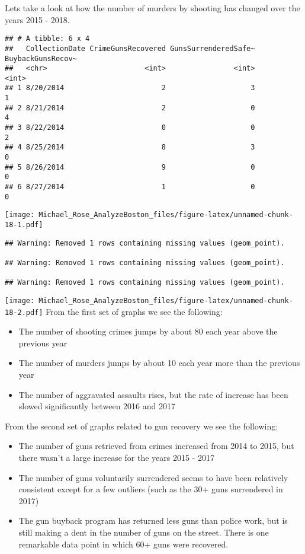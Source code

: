 \documentclass[]{article}
\providecommand{\tightlist}{%
  \setlength{\itemsep}{0pt}\setlength{\parskip}{0pt}}
\begin{document}
Lets take a look at how the number of murders by shooting has changed
over the years 2015 - 2018.

\begin{verbatim}
## # A tibble: 6 x 4
##   CollectionDate CrimeGunsRecovered GunsSurrenderedSafe~ BuybackGunsRecov~
##   <chr>                       <int>                <int>             <int>
## 1 8/20/2014                       2                    3                 1
## 2 8/21/2014                       2                    0                 4
## 3 8/22/2014                       0                    0                 2
## 4 8/25/2014                       8                    3                 0
## 5 8/26/2014                       9                    0                 0
## 6 8/27/2014                       1                    0                 0
\end{verbatim}

\texttt{[image: Michael\_Rose\_AnalyzeBoston\_files/figure-latex/unnamed-chunk-18-1.pdf]}

\begin{verbatim}
## Warning: Removed 1 rows containing missing values (geom_point).

## Warning: Removed 1 rows containing missing values (geom_point).

## Warning: Removed 1 rows containing missing values (geom_point).
\end{verbatim}

\texttt{[image: Michael\_Rose\_AnalyzeBoston\_files/figure-latex/unnamed-chunk-18-2.pdf]}
From the first set of graphs we see the following:

\begin{itemize}
\tightlist
\item
  The number of shooting crimes jumps by about 80 each year above the
  previous year
\item
  The number of murders jumps by about 10 each year more than the
  previous year
\item
  The number of aggravated assaults rises, but the rate of increase has
  been slowed significantly between 2016 and 2017
\end{itemize}

From the second set of graphs related to gun recovery we see the
following:

\begin{itemize}
\tightlist
\item
  The number of guns retrieved from crimes increased from 2014 to 2015,
  but there wasn't a large increase for the years 2015 - 2017
\item
  The number of guns voluntarily surrendered seems to have been
  relatively consistent except for a few outliers (such as the 30+ guns
  surrendered in 2017)
\item
  The gun buyback program has returned less guns than police work, but
  is still making a dent in the number of guns on the street. There is
  one remarkable data point in which 60+ guns were recovered.
\end{itemize}
\end{document}

